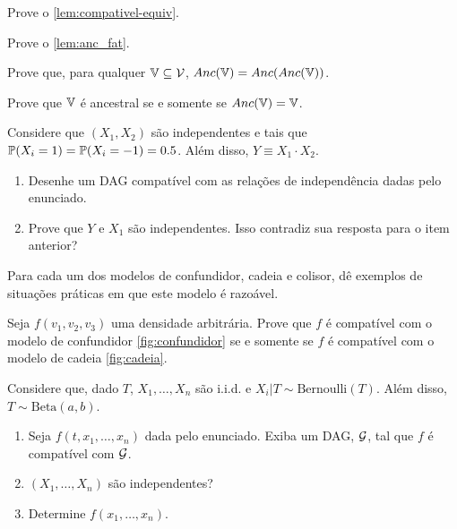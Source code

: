 \begin{exercise}
 Prove o \cref{lem:compativel-equiv}.
\end{exercise}

\begin{exercise}
 Prove o \cref{lem:anc_fat}.
\end{exercise}

\begin{exercise}
 Prove que, para qualquer $\V \subseteq \sV$,
 $Anc(\V) = Anc(Anc(\V))$.
\end{exercise}

\begin{exercise}
 Prove que $\V$ é ancestral se e somente se
 $Anc(\V) = \V$.
\end{exercise}

\begin{exercise}
 \label{ex:infiel}
 Considere que $(X_1,X_2)$ são independentes e
 tais que $\P(X_i=1)=\P(X_i=-1)=0.5$.
 Além disso, $Y \equiv X_1 \cdot X_2$.
 \begin{enumerate}[label=(\alph*)]
  \item Desenhe um DAG compatível
  com as relações de independência dadas pelo enunciado.
  \item Prove que $Y$ e $X_1$ são independentes.
  Isso contradiz sua resposta para o item anterior?
 \end{enumerate}
\end{exercise}

\begin{exercise}
 Para cada um dos modelos de confundidor, cadeia e colisor,
 dê exemplos de situações práticas em que este modelo é razoável.
\end{exercise}

\begin{exercise}
 Seja $f(v_1,v_2,v_3)$ uma densidade arbitrária.
 Prove que $f$ é compatível com
 o modelo de confundidor \cref{fig:confundidor}
 se e somente se
 $f$ é compatível com
 o modelo de cadeia \cref{fig:cadeia}.
\end{exercise}

\begin{exercise}
 Considere que, dado $T$, $X_1,\ldots,X_n$ são i.i.d. e
 $X_i|T \sim \text{Bernoulli}(T)$. Além disso,
 $T \sim \text{Beta}(a,b)$.
 \begin{enumerate}[label=(\alph*)]
  \item Seja $f(t,x_1,\ldots,x_n)$ dada pelo enunciado.
  Exiba um DAG, $\sG$, tal que $f$ é compatível com $\sG$.
  \item $(X_1,\ldots,X_n)$ são independentes?
  \item Determine $f(x_1,\ldots,x_n)$.
 \end{enumerate}
\end{exercise}

